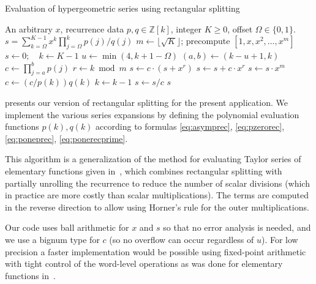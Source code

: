 \documentclass[nohypdvips,review]{siamart0216}
\begin{document}
\begin{algorithm}[h!]
  \caption{Evaluation of hypergeometric series using rectangular splitting}
  \small
  \label{alg:hyprs}
  \begin{algorithmic}[1]
    \Require An arbitrary $x$, recurrence data $p, q \in \mathbb{Z}[k]$, integer $K \ge 0$, offset $\Omega \in \{0,1\}$.
    \Ensure $s = \sum_{k=\Omega}^{K-1} x^k \prod_{j=\Omega}^k p(j) / q(j)$
    \State $m \gets \lfloor \sqrt K \rfloor$; precompute $[1, x, x^2, \ldots, x^m]$ 
    \State $s \gets 0; \quad k \gets K - 1$
        \State $u \gets \min(4, k + 1 - \Omega)$  
        \State $(a, b) \gets (k - u + 1, k)$  
        \State $c \gets \prod_{j=a}^b p(j)$ 
            \State $r \gets k \bmod m$
                \State $s \gets c \cdot (s + x^r)$ 
            \Else
                \State $s \gets s + c \cdot x^r$ 
            \EndIf
                \State $s \gets s \cdot x^m$ 
            \EndIf
            \State $c \gets (c / p(k)) q(k)$ 
            \State $k \gets k - 1$
        \EndWhile
        \State $s \gets s / c$
    \EndWhile
    \State \Return $s$
  \end{algorithmic}
\end{algorithm}

 presents our version of rectangular splitting
for the present application.
We implement the various series expansions by defining
the polynomial evaluation functions $p(k), q(k)$ according to formulas
\cref{eq:asymprec}, \cref{eq:pzerorec},
\cref{eq:poneprec}, \cref{eq:ponerecprime}.

This algorithm is a generalization of the
method for evaluating Taylor series of elementary
functions given in~\cite{Johansson2015elementary},
which combines rectangular splitting
with partially unrolling the recurrence to reduce the number of scalar divisions
(which in practice are more costly than scalar multiplications).
The terms are computed in the reverse direction to allow
using Horner's rule for the outer
multiplications.

Our code uses ball arithmetic for $x$ and $s$
so that no error analysis is needed, and we use a bignum type for $c$ (so
no overflow can occur regardless of $u$).
For low precision a faster implementation
would be possible using fixed-point arithmetic with tight
control of the word-level operations
as was done for elementary functions in~\cite{Johansson2015elementary}.
\end{document}
